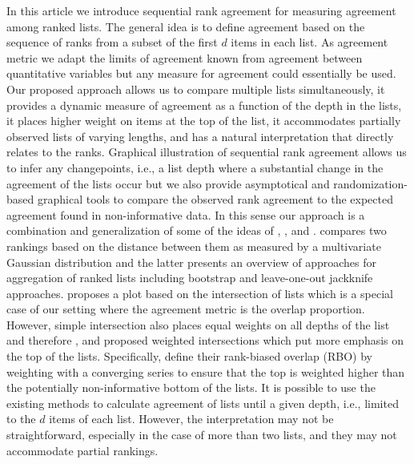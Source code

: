 \documentclass[oupdraft]{bio}
\newcommand{\added}[1]{{\color{added}{}#1}}
\begin{document}
In this article we introduce sequential rank agreement for measuring
agreement among ranked lists.  The general idea is to define agreement
based on the sequence of ranks from a subset of the first $d$ items in
each list. As agreement metric we adapt the limits of agreement known
from agreement between quantitative variables
\citep{alt:bland:1983} but any measure for agreement
could essentially be used. Our proposed approach allows us to compare
multiple lists simultaneously, it provides a dynamic measure of
agreement as a function of the depth in the lists, it places higher
weight on items at the top of the list, it accommodates partially
observed lists of varying lengths, and has a natural interpretation
that directly relates to the ranks.  Graphical illustration of
sequential rank agreement allows us to infer any changepoints, i.e., a
list depth where a substantial change in the agreement of the lists
occur but we also provide asymptotical and randomization-based
graphical tools to compare the observed rank agreement to the expected
agreement found in non-informative data.  In this sense our approach
is a combination and generalization of some of the ideas of
\added{\citet{iriz:etal:2005}}, \citet{Carterette2009}, and
\citet{Boulesteix2009}. \citet{Carterette2009} compares two rankings
based on the distance between them as measured by a multivariate
Gaussian distribution and the latter presents an overview of
approaches for aggregation of ranked lists including bootstrap and
leave-one-out jackknife approaches. \added{\citet{iriz:etal:2005}
  proposes a plot based on the intersection of lists which is a
  special case of our setting where the agreement metric is the
  overlap proportion}. However, simple intersection also places equal
weights on all depths of the list and therefore \citet{Fagin2003}, and
\citet{Webber2010} proposed weighted intersections which put more
emphasis on the top of the lists.  Specifically, \citet{Webber2010}
define their rank-biased overlap (RBO) by weighting with a converging
series to ensure that the top is weighted higher than the potentially
non-informative bottom of the lists.  It is possible to use the
existing methods to calculate agreement of lists until a given depth,
i.e., limited to the $d$ items of each list. However, the
interpretation may not be straightforward, especially in the case of
more than two lists, and they may not accommodate partial rankings.
\end{document}
